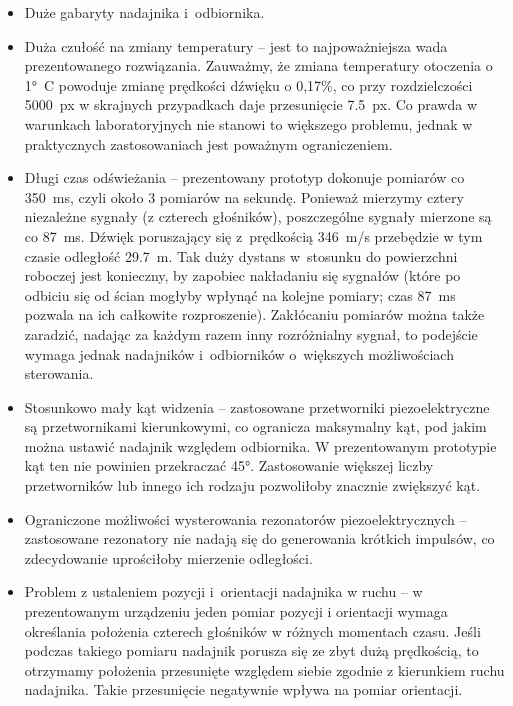 \begin{itemize}
 \item Duże gabaryty nadajnika i~odbiornika.
 
 \item Duża czułość na zmiany temperatury -- jest to najpoważniejsza wada prezentowanego rozwiązania.
 Zauważmy, że zmiana temperatury otoczenia o \ang{1}\SI{}{C} powoduje zmianę prędkości dźwięku o 0,17\%,
 co przy rozdzielczości \SI{5000}{px} w skrajnych przypadkach daje przesunięcie \SI{7.5}{px}.
 Co prawda w warunkach laboratoryjnych nie stanowi to większego problemu, jednak w praktycznych zastosowaniach
 jest poważnym ograniczeniem.
 
 \item Długi czas odświeżania -- prezentowany prototyp dokonuje pomiarów co \SI{350}{ms}, czyli około 3 pomiarów 
 na sekundę. Ponieważ mierzymy cztery niezależne sygnały (z czterech głośników), poszczególne sygnały mierzone są co \SI{87}{ms}.
  Dźwięk poruszający się z~prędkością \SI{346}{m/s}  przebędzie  w tym czasie odległość \SI{29.7}{m}.
 Tak duży dystans w~stosunku do powierzchni roboczej jest konieczny, by zapobiec nakładaniu się sygnałów
 (które po odbiciu się od ścian mogłyby wpłynąć na kolejne pomiary; czas \SI{87}{ms} pozwala 
 na ich całkowite rozproszenie).
 Zakłócaniu pomiarów można także zaradzić, nadając za każdym razem inny rozróżnialny sygnał, to podejście 
 wymaga jednak nadajników i~odbiorników o~większych możliwościach sterowania.
 
 \item Stosunkowo mały kąt widzenia -- zastosowane przetworniki piezoelektryczne są przetwornikami kierunkowymi, co 
 ogranicza  maksymalny kąt, pod jakim można ustawić nadajnik względem odbiornika. W prezentowanym 
 prototypie kąt ten nie powinien przekraczać \ang{45}. Zastosowanie większej liczby przetworników lub innego ich rodzaju
 pozwoliłoby znacznie zwiększyć kąt.

 \item Ograniczone możliwości wysterowania rezonatorów piezoelektrycznych -- 
 zastosowane rezonatory nie nadają się do generowania krótkich impulsów, co zdecydowanie uprościłoby mierzenie odległości.
 
 \item Problem z ustaleniem pozycji i~orientacji nadajnika w ruchu -- w prezentowanym urządzeniu 
 jeden pomiar pozycji i orientacji wymaga określania położenia czterech głośników w różnych momentach czasu.
 Jeśli podczas takiego pomiaru nadajnik porusza się ze zbyt dużą prędkością, to otrzymamy położenia
 przesunięte względem siebie zgodnie z kierunkiem ruchu nadajnika. Takie przesunięcie negatywnie wpływa na 
 pomiar orientacji. 
\end{itemize}


